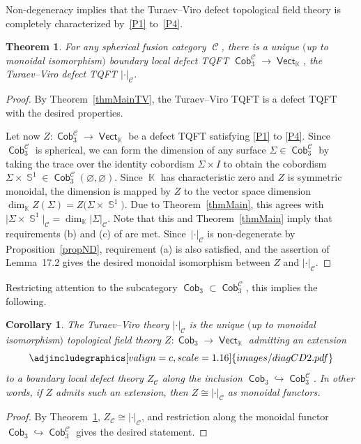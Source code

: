 \documentclass[pdftex]{sigma}
\DeclareMathOperator{\vect}{\mathsf{Vect}}
\DeclareMathOperator{\K}{\mathbb{K}}
\DeclareMathOperator{\Sp}{\mathbb{S}}
\DeclareMathOperator{\Cob}{\mathsf{Cob}}
\DeclareMathOperator{\calc}{\mathcal{C}}
\numberwithin{equation}{section}
\newtheorem{Theorem}{Theorem}[section]
\newtheorem{Corollary}[Corollary]{Corollary}
\theoremstyle{definition}
\begin{document}
Non-degeneracy implies that the Turaev--Viro defect topological field theory is completely characterized by~\ref{P1} to~\ref{P4}.
\begin{Theorem}\label{thmComb}
For any spherical fusion category $\calc$, there is a unique $($up to monoidal iso\-mor\-phism$)$ boundary local defect TQFT $\Cob_3^{\calc} \rightarrow \vect_{\K}$, the Turaev--Viro defect TQFT $|\cdot|_{\calc}$.
\end{Theorem}
\begin{proof}By Theorem~\ref{thmMainTV}, the Turaev--Viro TQFT is a defect TQFT with the desired properties.

Let now $Z\colon \Cob_3^{\calc} \rightarrow \vect_{\K}$ be a defect TQFT satisfying \ref{P1} to \ref{P4}. Since $\Cob_3^{\calc}$ is spherical, we can form the dimension of any surface $\Sigma \in \Cob_3^{\calc}$ by taking the trace over the identity cobordism $\Sigma \times I$ to obtain the cobordism $\Sigma \times \Sp^1 \in \Cob_3^{\calc}(\varnothing, \varnothing)$. Since $\K$ has characteristic zero and $Z$ is symmetric monoidal, the dimension is mapped by $Z$ to the vector space dimension $\dim_{\K}Z(\Sigma) = Z\bigl(\Sigma \times \Sp^1\bigr)$. Due to Theorem~\ref{thmMain}, this agrees with $\bigl|\Sigma \times \Sp^1\bigr|_{\calc} = \dim_{\K}|\Sigma|_{\calc}$. Note that this and Theorem~\ref{thmMain} imply that requirements (b) and (c) of \cite[Lemma~17.2]{TV} are met. Since~$| \cdot |_{\calc}$ is non-degenerate by Proposition~\ref{propND}, requirement (a) is also satisfied, and the assertion of Lemma~17.2 gives the desired monoidal isomorphism between $Z$ and $| \cdot |_{\calc}$.
\end{proof}

Restricting attention to the subcategory $\Cob_3 \subset \Cob_3^{\calc}$, this implies the following.
\begin{Corollary}
 \label{corThmMain2}
 The Turaev--Viro theory $|\cdot|_{\calc}$ is the unique $($up to monoidal isomorphism$)$ topological field theory $Z\colon \Cob_3 \rightarrow \vect_{\K}$ admitting an extension
 \[
 \centering
 \adjincludegraphics[valign=c, scale = 1.16]{images/diagCD2.pdf}
 \]
 to a boundary local defect theory $Z_{\calc}$ along the inclusion $\Cob_3 \hookrightarrow \Cob_3^{\calc}$. In other words, if $Z$ admits such an extension, then $Z \cong |\cdot|_{\calc}$ as monoidal functors.
\end{Corollary}
\begin{proof}
By Theorem~\ref{thmComb}, $Z_{\calc} \cong | \cdot |_{\calc}$, and restriction along the monoidal functor $\Cob_3 \hookrightarrow \Cob_3^{\calc}$ gives the desired statement.
\end{proof}
\end{document}
